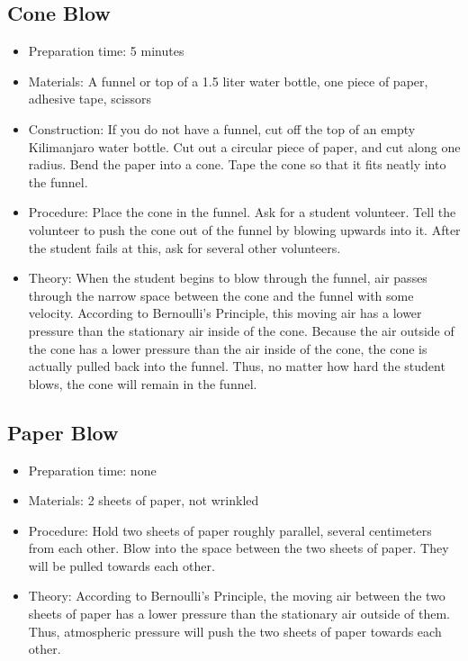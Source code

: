 \subsection{Cone Blow}
\begin{itemize}
\item{Preparation time: 5 minutes}
\item{Materials: A funnel or top of a 1.5 liter water bottle, one piece of paper, adhesive tape, scissors}
\item{Construction: If you do not have a funnel, cut off the top of an empty Kilimanjaro water bottle. Cut out a circular piece of paper, and cut along one radius. Bend the paper into a cone. Tape the cone so that it fits neatly into the funnel.}
\item{Procedure: Place the cone in the funnel. Ask for a student volunteer. Tell the volunteer to push the cone out of the funnel by blowing upwards into it. After the student fails at this, ask for several other volunteers.}
\item{Theory: When the student begins to blow through the funnel, air passes through the narrow space between the cone and the funnel with some velocity. According to Bernoulli’s Principle, this moving air has a lower pressure than the stationary air inside of the cone. Because the air outside of the cone has a lower pressure than the air inside of the cone, the cone is actually pulled back into the funnel. Thus, no matter how hard the student blows, the cone will remain in the funnel.}
\end{itemize}

\subsection{Paper Blow}
\begin{itemize}
\item{Preparation time: none}
\item{Materials: 2 sheets of paper, not wrinkled}
\item{Procedure: Hold two sheets of paper roughly parallel, several centimeters from each other. Blow into the space between the two sheets of paper. They will be pulled towards each other.}
\item{Theory: According to Bernoulli’s Principle, the moving air between the two sheets of paper has a lower pressure than the stationary air outside of them. Thus, atmospheric pressure will push the two sheets of paper towards each other.}
\end{itemize}

